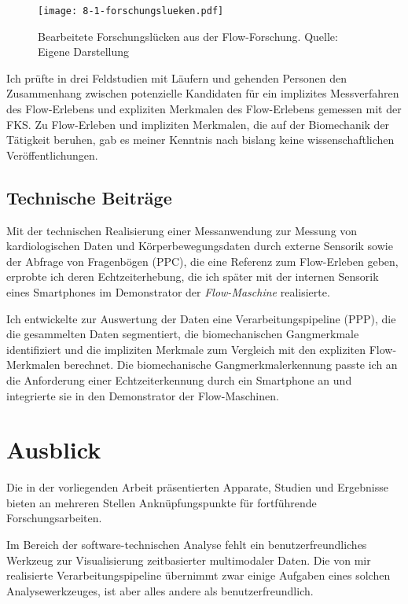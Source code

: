 \begin{figure}[t]
	\centering
		\texttt{[image: 8-1-forschungslueken.pdf]}
	\caption[Bearbeitete Forschungslücken aus der Flow-Forschung]{Bearbeitete Forschungslücken aus der Flow-Forschung. Quelle: Eigene Darstellung}
	\label{fig:8_1_forschungslueken}
\end{figure}

Ich prüfte in drei Feldstudien mit Läufern und gehenden Personen den Zusammenhang zwischen potenzielle Kandidaten für ein implizites Messverfahren des Flow-Erlebens und expliziten Merkmalen des Flow-Erlebens gemessen mit der \ac{FKS}. Zu Flow-Erleben und impliziten Merkmalen, die auf der Biomechanik der Tätigkeit beruhen, gab es meiner Kenntnis nach bislang keine wissenschaftlichen Veröffentlichungen. 

\subsection{Technische Beiträge}
Mit der technischen Realisierung einer Messanwendung zur Messung von kardiologischen Daten und Körperbewegungsdaten durch externe Sensorik sowie der Abfrage von Fragenbögen (PPC), die eine Referenz zum Flow-Erleben geben, erprobte ich deren Echtzeiterhebung, die ich später mit der internen Sensorik eines Smartphones im Demonstrator der \emph{Flow-Maschine} realisierte. 

Ich entwickelte zur Auswertung der Daten eine Verarbeitungspipeline (\ac{PPP}), die die gesammelten Daten segmentiert, die biomechanischen Gangmerkmale identifiziert und die impliziten Merkmale zum Vergleich mit den expliziten Flow-Merkmalen berechnet. Die biomechanische Gangmerkmalerkennung passte ich an die Anforderung einer Echtzeiterkennung durch ein Smartphone an und integrierte sie in den Demonstrator der Flow-Maschinen. 

\section{Ausblick} 
\label{sec:ausblick} 
Die in der vorliegenden Arbeit präsentierten Apparate, Studien und Ergebnisse bieten an mehreren Stellen Anknüpfungspunkte für fortführende Forschungsarbeiten.

Im Bereich der software-technischen Analyse fehlt ein benutzerfreundliches Werkzeug zur Visualisierung zeitbasierter multimodaler Daten. Die von mir realisierte Verarbeitungspipeline übernimmt zwar einige Aufgaben eines solchen Analysewerkzeuges, ist aber alles andere als benutzerfreundlich. 

